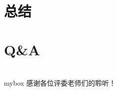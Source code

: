 \documentclass[10pt,aspectratio=43,mathserif]{beamer}
\begin{document}
\section[总结]{总结}
%	
\section[QA]{Q\&A}
%	
\section*{}
\begin{frame}
\begin{center}
\begin{minipage}{1\textwidth}
\begin{beamercolorbox}[wd=0.70\textwidth, rounded=true, shadow=true]{mybox}
\LARGE \centering 感谢各位评委老师们的聆听！
\end{beamercolorbox}
\end{minipage}
\end{center}
\end{frame}
\end{document}
